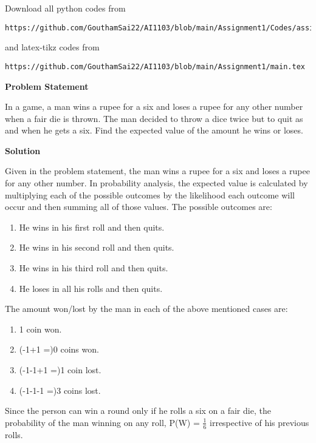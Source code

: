 \documentclass[journal,12pt,twocolumn]{IEEEtran}
\begin{document}
\maketitle
\newpage
\bigskip
\renewcommand{\thefigure}{\theenumi}
\renewcommand{\thetable}{\theenumi}
Download all python codes from 
\begin{lstlisting}
https://github.com/GouthamSai22/AI1103/blob/main/Assignment1/Codes/assign1.py
\end{lstlisting}
%
and latex-tikz codes from 
%
\begin{lstlisting}
https://github.com/GouthamSai22/AI1103/blob/main/Assignment1/main.tex
\end{lstlisting}
\begin{center}
   \textbf{Problem Statement} 
\end{center}
In a game, a man wins a rupee for a six and loses a rupee for any other number when a fair die is thrown. The man decided to throw a dice twice but to quit as and when he gets a six. Find the expected value of the amount he wins or loses.
\begin{center}
    \textbf{Solution}
\end{center}
Given in the problem statement, the man wins a rupee for a six and loses a rupee for any other number. In probability analysis, the expected value is calculated by multiplying each of the possible outcomes by the likelihood each outcome will occur and then summing all of those values. The possible outcomes are:
\begin{enumerate}
    \item He wins in his first roll and then quits.
    \item He wins in his second roll and then quits.
    \item He wins in his third roll and then quits.
    \item He loses in all his rolls and then quits.
\end{enumerate}
The amount won/lost by the man in each of the above mentioned cases are:
\begin{enumerate}
    \item 1 coin won.
    \item (-1+1 =)0 coins won.
    \item (-1-1+1 =)1 coin lost.
    \item (-1-1-1 =)3 coins lost.
\end{enumerate}
Since the person can win a round only if he rolls a six on a fair die, the probability of the man winning on any roll, P(W) = $\frac{1}{6}$ irrespective of his previous rolls.\newline
\end{document}
